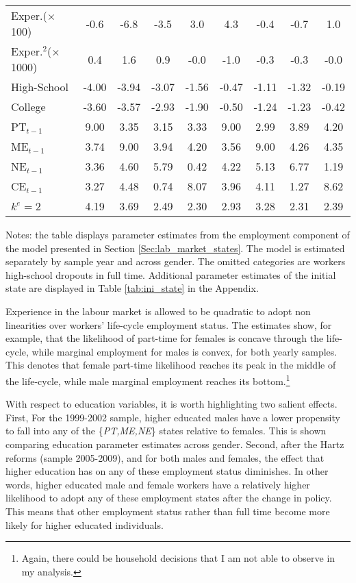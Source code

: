 \documentclass[12pt, a4paper]{article}
\begin{document}
\begin{table}[!t]
{{\begin{threeparttable}
\begin{tabular} {@{} l | c | c | c | c | c | c | c | c |  @{}}
					Exper.($\times$100)			&-0.6&-6.8&-3.5&3.0		&4.3&-0.4&-0.7&1.0\\[1mm]
					Exper.$^2$($\times$1000)		&0.4&1.6&0.9&-0.0		&-1.0&-0.3&-0.3&-0.0\\[1mm]
					High-School &-4.00&-3.94&-3.07&-1.56		&-0.47&-1.11&-1.32&-0.19\\[1mm]
					College 	&-3.60&-3.57&-2.93&-1.90		&-0.50&-1.24&-1.23&-0.42\\[1mm]
					PT$_{t-1}$			&9.00&3.35&3.15&3.33			&9.00&2.99&3.89&4.20\\[1mm]
					ME$_{t-1}$			&3.74&9.00&3.94&4.20			&3.56&9.00&4.26&4.35\\[1mm]
					NE$_{t-1}$			&3.36&4.60&5.79&0.42			&4.22&5.13&6.77&1.19\\[1mm]
					CE$_{t-1}$			&3.27&4.48&0.74&8.07			&3.96&4.11&1.27&8.62\\[1mm]
					$k^{e} = 2 $&4.19&3.69&2.49&2.30			&2.93&3.28&2.31&2.39\\[1mm]
					\hline
				\end{tabular}
				\begin{tablenotes}
					\item {Notes: the table displays parameter estimates from the employment component of the model presented in Section \ref{Sec:lab_market_states}. The model is estimated separately by sample year and across gender. The omitted categories are workers high-school dropouts in full time. Additional parameter estimates of the initial state are displayed in Table \ref{tab:ini_state} in the Appendix.} 
				\end{tablenotes}
	\end{threeparttable}}}
\end{table}

Experience in the labour market is allowed to be quadratic to adopt non linearities over workers' life-cycle employment status. The estimates show, for example, that the likelihood of part-time for females is concave through the life-cycle, while marginal employment for males is convex, for both yearly samples. This denotes that female part-time likelihood reaches its peak in the middle of the life-cycle, while male marginal employment reaches its bottom.\footnote{Again, there could be household decisions that I am not able to observe in my analysis.} 



With respect to education variables, it is worth highlighting two salient effects. First, For the 1999-2002 sample, higher educated males have a lower propensity to fall into any of the \{\emph{PT,ME,NE}\} states relative to females. This is shown comparing education parameter estimates across gender. Second, after the Hartz reforms (sample 2005-2009), and for both males and females, the effect that higher education has on any of these employment status diminishes. In other words, higher educated male and female workers have a relatively higher likelihood to adopt any of these employment states after the change in policy. This means that other employment status rather than full time become more likely for higher educated individuals.
\end{document}
